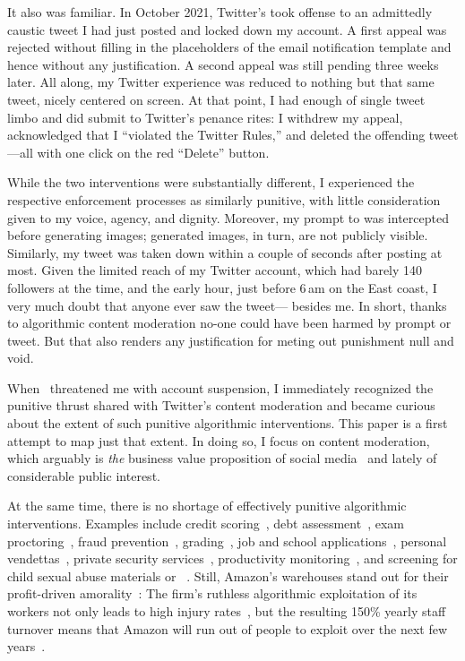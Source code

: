 It also was familiar. In October 2021, Twitter's  took offense to an
admittedly caustic tweet I had just posted and locked down my account. A first
appeal was rejected without filling in the placeholders of the email
notification template and hence without any justification. A second appeal was
still pending three weeks later. All along, my Twitter experience was reduced to
nothing but that same tweet, nicely centered on screen. At that point, I had
enough of single tweet limbo and did submit to Twitter's penance rites: I
withdrew my appeal, acknowledged that I ``violated the Twitter Rules,'' and
deleted the offending tweet---all with one click on the red ``Delete'' button.

While the two interventions were substantially different, I experienced the
respective enforcement processes as similarly punitive, with little
consideration given to my voice, agency, and dignity. Moreover, my prompt to
\DALLE{} was intercepted before generating images; generated images, in turn, are
not publicly visible. Similarly, my tweet was taken down within a couple of
seconds after posting at most. Given the limited reach of my Twitter account,
which had barely 140 followers at the time, and the early hour, just before
6$\,$am on the East coast, I very much doubt that anyone ever saw the tweet---%
besides me. In short, thanks to algorithmic content moderation no-one could have
been harmed by prompt or tweet. But that also renders any justification for
meting out punishment null and void.

When \DALLE\ threatened me with account suspension, I immediately recognized
the punitive thrust shared with Twitter's content moderation and became curious
about the extent of such punitive algorithmic interventions. This paper is a
first attempt to map just that extent. In doing so, I focus on content
moderation, which arguably is \emph{the} business value proposition of social
media~\cite{Masnick2022a,Patel2022a} and lately of considerable public interest.

At the same time, there is no shortage of effectively punitive algorithmic
interventions. Examples include credit scoring~\cite{Anonymous2018}, debt
assessment~\cite{Yampolskiy2015}, exam proctoring~\cite{FrancisWard2021b}, fraud
prevention~\cite{Kugel2022}, grading~\cite{Lam2020}, job and school
applications~\cite{Anonymous2016,Hall2012,Hall2020a,Stockton2020}, personal
vendettas~\cite{Casovan2022}, private security services~\cite{HaoSwart2022},
productivity
monitoring~\cite{Covert2022,HaoFreischlad2022,KantorSundaramea2022,Rosenblat2018},
and screening for child sexual abuse materials or ~\cite{Atherton2022a}.
Still, Amazon's warehouses stand out for their profit-driven
amorality~\cite{KantorWeiseea2021,Lennard2020}: The firm's ruthless algorithmic
exploitation of its workers not only leads to high injury
rates~\cite{Brown2019a,Clark2023,Sainato2021}, but the resulting 150\% yearly
staff turnover means that Amazon will run out of people to exploit over the next
few years~\cite{Sainato2022}.

